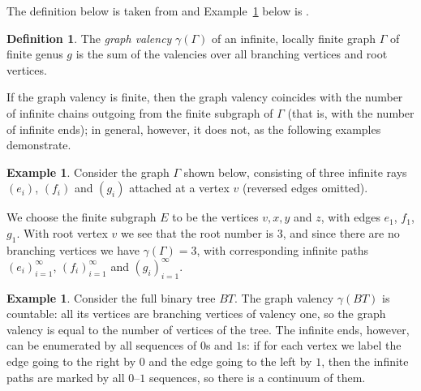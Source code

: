 \documentclass[12pt,reqno]{amsart}
\theoremstyle{plain}
\theoremstyle{definition}
\newtheorem{definition}[theorem]{Definition}
\newtheorem{example}[theorem]{Example}
\begin{document}
The definition below is taken from \cite[Definition~1.4]{Iyudu} and Example~\ref{ex:binary-tree}
below is \cite[Example~1]{Iyudu}.

\begin{definition}\label{def:valency}
The \emph{graph valency} $\gamma(\Gamma)$ of an infinite, locally finite graph $\Gamma$ of finite
genus $g$ is the sum of the valencies over all branching vertices and root vertices.
\end{definition}

If the graph valency is finite, then the graph valency coincides with the number of infinite chains outgoing from
the finite subgraph of $\Gamma$ \textup(that is, with the number of infinite ends\textup); in
general, however, it does not, as the following examples demonstrate.

\begin{example}\label{ex:tripod-gamma}
Consider the graph $\Gamma$ shown below, consisting of three infinite rays $(e_i)$, $(f_i)$ and
$(g_i)$ attached at a vertex $v$ \textup(reversed edges omitted\textup).
\begin{center}
\end{center}
We choose the finite subgraph $E$ to be the vertices $v,x,y$ and $z$, with edges $e_1$, $f_1$,
$g_1$. With root vertex $v$ we see that the root number is $3$, and since there are no branching
vertices we have $\gamma(\Gamma)=3$, with corresponding infinite paths $(e_i)_{i=1}^{\infty}$,
$(f_i)_{i=1}^{\infty}$ and $(g_i)_{i=1}^{\infty}$.
\end{example}

\begin{example}\label{ex:binary-tree}
Consider the full binary tree $BT$. The graph valency $\gamma(BT)$ is countable: all its vertices
are branching vertices of valency one, so the graph valency is equal to the number of vertices of
the tree. The infinite ends, however, can be enumerated by all sequences of $0$s and $1$s: if for
each vertex we label the edge going to the right by $0$ and the edge going to the left by $1$,
then the infinite paths are marked by all $0$--$1$ sequences, so there is a continuum of them.
\end{example}
\end{document}
